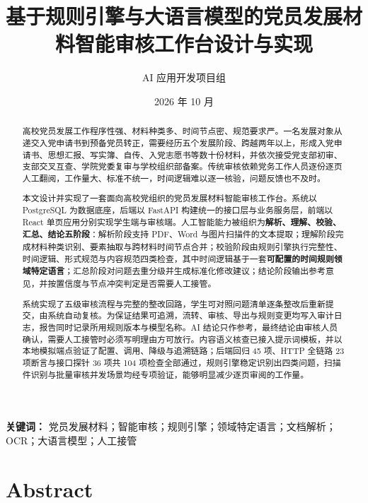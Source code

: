 \documentclass[12pt,a4paper]{ctexart}
\title{\textbf{基于规则引擎与大语言模型的党员发展材料智能审核工作台设计与实现}}
\author{AI 应用开发项目组}
\date{2026 年 10 月}
\begin{document}
\maketitle
\thispagestyle{empty}

\begin{abstract}

高校党员发展工作程序性强、材料种类多、时间节点密、规范要求严。一名发展对象从递交入党申请书到预备党员转正，需要经历五个发展阶段、跨越两年以上，形成入党申请书、思想汇报、写实簿、自传、入党志愿书等数十份材料，并依次接受党支部初审、支部交叉互查、学院党委复审与学校组织部备案。传统审核依赖党务工作人员逐份逐页人工翻阅，工作量大、标准不统一，时间逻辑难以逐一核验，问题反馈也不及时。

本文设计并实现了一套面向高校党组织的党员发展材料智能审核工作台。系统以 PostgreSQL 为数据底座，后端以 FastAPI 构建统一的接口层与业务服务层，前端以 React 单页应用分别实现学生端与审核端。人工智能能力被组织为\textbf{解析、理解、校验、汇总、结论五阶段}：解析阶段支持 PDF、Word 与图片扫描件的文本提取；理解阶段完成材料种类识别、要素抽取与跨材料时间节点合并；校验阶段由规则引擎执行完整性、时间逻辑、形式规范与内容规范四类检查，其中时间逻辑基于一套\textbf{可配置的时间规则领域特定语言}；汇总阶段对问题去重分级并生成标准化修改建议；结论阶段输出参考意见，并按置信度与节点冲突判定是否需要人工接管。

系统实现了五级审核流程与完整的整改回路，学生可对照问题清单逐条整改后重新提交，由系统自动复核。为保证结果可追溯，流转、审核、导出与规则变更均写入审计日志，报告同时记录所用规则版本与模型名称。AI 结论只作参考，最终结论由审核人员确认，需要人工接管时必须写明理由方可放行。内容语义核查已接入提示词模板，并以本地模拟端点验证了配置、调用、降级与追溯链路；后端回归 45 项、HTTP 全链路 23 项断言与接口探针 36 项共 104 项检查全部通过，规则引擎稳定识别出四类问题，扫描件识别与批量审核并发场景均经专项验证，能够明显减少逐页审阅的工作量。
\end{abstract}

\vspace{1em}
\noindent\textbf{关键词：} 党员发展材料；智能审核；规则引擎；领域特定语言；文档解析；OCR；大语言模型；人工接管

\section*{Abstract}
\end{document}
